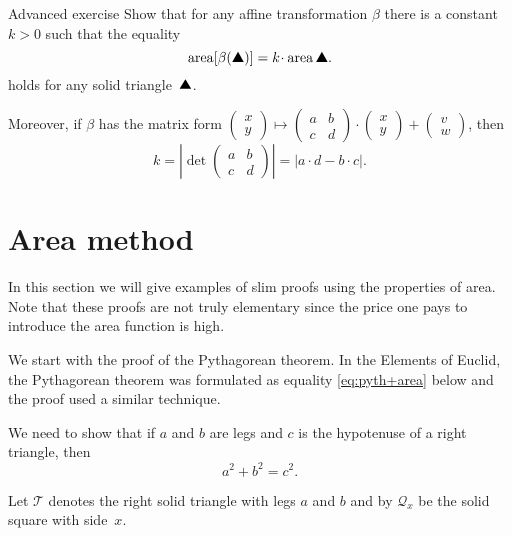 \begin{thm}{Advanced exercise}\label{ex:area-affine}
Show that for any affine transformation $\beta$ there is a constant $k>0$
such that the equality 
\[\area[\beta(\solidtriangle)]=k\cdot\area\solidtriangle.\]
holds for any solid triangle~$\solidtriangle$.

Moreover, if $\beta$ has the matrix form $\left(\begin{smallmatrix}
x\\ y
\end{smallmatrix} \right)
  \mapsto
  \left(\begin{smallmatrix}
a&b\\ c&d
\end{smallmatrix} \right)
  \cdot
  \left(\begin{smallmatrix}
x\\ y
\end{smallmatrix} \right)
  +
\left(\begin{smallmatrix}
v\\ w
\end{smallmatrix} \right)$,
then 
\[k=|\det\left(\begin{smallmatrix}
a&b\\ c&d
\end{smallmatrix} \right)|=|a\cdot d-b\cdot c|.\]

\end{thm}





\section*{Area method}

In this section we will give examples of
slim proofs using the properties of area.
Note that these proofs are not truly elementary since the price one pays to introduce the area function is high.

We start with the proof of the Pythagorean theorem.
In the Elements of Euclid, the Pythagorean theorem was formulated as equality  \ref{eq:pyth+area} below
and the proof used a similar technique.

We need to show that 
if $a$ and $b$ are legs and $c$ is the hypotenuse 
of a right triangle, then
\[a^2+b^2=c^2.\]

Let $\mathcal{T}$ denotes the right solid triangle with legs $a$ and $b$
and  by $\mathcal{Q}_{x}$ be the solid square 
with side~$x$.

